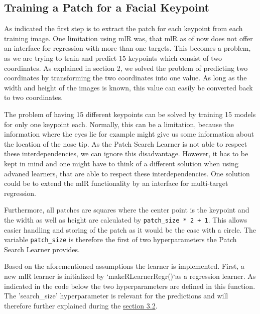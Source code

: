 \documentclass[]{article}
\begin{document}
\subsection{Training a Patch for a Facial
Keypoint}\label{patch-search-train}

As indicated the first step is to extract the patch for each keypoint
from each training image. One limitation using mlR was, that mlR as of
now does not offer an interface for regression with more than one
targets. This becomes a problem, as we are trying to train and predict
15 keypoints which consist of two coordinates. As explained in section
2, we solved the problem of predicting two coordinates by transforming
the two coordinates into one value. As long as the width and height of
the images is known, this value can easily be converted back to two
coordinates.

The problem of having 15 different keypoints can be solved by training
15 models for only one keypoint each. Normally, this can be a
limitation, because the information where the eyes lie for example might
give us some information about the location of the nose tip. As the
Patch Search Learner is not able to respect these interdependencies, we
can ignore this disadvantage. However, it has to be kept in mind and one
might have to think of a different solution when using advaned learners,
that are able to respect these interdependencies. One solution could be
to extend the mlR functionality by an interface for multi-target
regression.

Furthermore, all patches are squares where the center point is the
keypoint and the width as well as height are calculated by
\texttt{patch\_size\ *\ 2\ +\ 1}. This allows easier handling and
storing of the patch as it would be the case with a circle. The variable
\texttt{patch\_size} is therefore the first of two hyperparameters the
Patch Search Learner provides.

Based on the aforementioned assumptions the learner is implemented.
First, a new mlR learner is initialized by `makeRLearnerRegr()`as a
regression learner. As indicated in the code below the two
hyperparameters are defined in this function. The 'search\_size'
hyperparameter is relevant for the predictions and will therefore
further explained during the
\protect\hyperlink{patch-search-pred}{section 3.2}.
\end{document}
